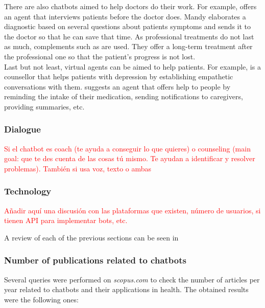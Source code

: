 \documentclass[12pt,english]{article}
\begin{document}
There are also chatbots aimed to help doctors do their work. For example, \cite{Ni201738} offers an agent that interviews patients before the doctor does. Mandy elaborates a diagnostic based on several questions about patients symptoms and sends it to the doctor so that he can save that time. As professional treatments do not last as much, complements such as \cite{DAlfonso2017} are used. They offer a long-term treatment after the professional one so that the patient's progress is not lost. \\

Last but not least, virtual agents can be aimed to help patients. For example, \cite{Harilal2020349} is a counsellor that helps patients with depression by establishing empathetic conversations with them. \cite{Roca2020954} suggests an agent that offers help to people by reminding the intake of their medication, sending notifications to caregivers, providing summaries, etc.


\subsubsection{Dialogue}

\textcolor{red}{Si el chatbot es coach (te ayuda a conseguir lo que quieres) o counseling (main goal: que te des cuenta de las cosas tú mismo. Te ayudan a identificar y resolver problemas). También si usa voz, texto o ambas}
\subsubsection{Technology}

\textcolor{red}{Añadir aquí una discusión con las plataformas que existen, número de usuarios, si tienen API para implementar bots, etc.}

A review of each of the previous sections can be seen in \cite{Montenegro201956}
\subsubsection{Number of publications related to chatbots}

Several queries were performed on \textit{scopus.com} to check the number of articles per year related to chatbots and their applications in health. The obtained results were the following ones:
\end{document}
